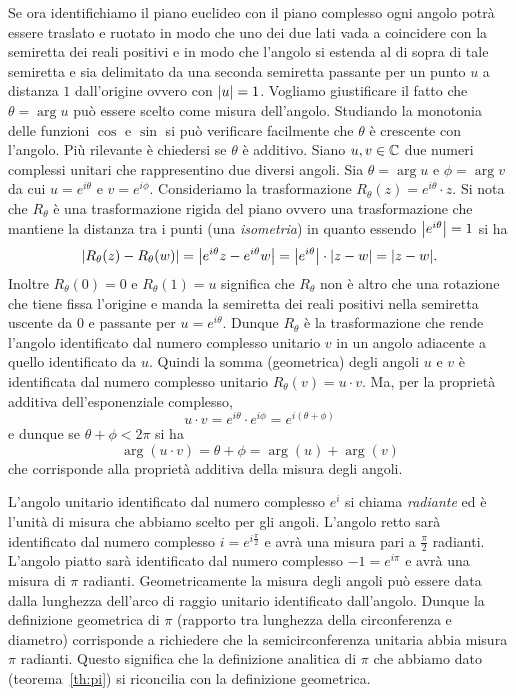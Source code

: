 Se ora identifichiamo il piano euclideo con il piano complesso ogni angolo
potrà essere traslato e ruotato in modo che uno dei due lati vada
a coincidere con la semiretta dei reali positivi e in modo che l'angolo si
estenda al di sopra di tale semiretta e sia delimitato da una seconda
semiretta passante per un punto $u$ a distanza $1$ dall'origine
ovvero con ${\left|u\right|}=1$. Vogliamo giustificare il fatto che $\theta = \arg u$
può essere scelto come misura dell'angolo.
Studiando la monotonia delle funzioni $\cos$ e $\sin$ si può verificare facilmente
che $\theta$ è crescente con l'angolo. Più rilevante è chiedersi se
$\theta$ è additivo.
Siano $u,v\in {\mathbb C}$ due numeri complessi unitari che rappresentino due diversi
angoli. Sia $\theta = \arg u$ e $\phi=\arg v$ da cui
$u=e^{i\theta}$ e $v=e^{i\phi}$.
Consideriamo la trasformazione $R_\theta(z) = e^{i\theta}\cdot z$.
Si nota che $R_\theta$ è una trasformazione rigida del piano ovvero
una trasformazione che mantiene la distanza tra i punti
(una \emph{isometria})
in quanto essendo ${\left|e^{i\theta}\right|}=1$ si ha
\[
{\left|R_\theta(z)-R_\theta(w)\right|} = {\left|e^{i\theta}z-e^{i\theta}w\right|}
= {\left|e^{i\theta}\right|}\cdot{\left|z-w\right|} = {\left|z-w\right|}.
\]
Inoltre $R_\theta(0)=0$ e $R_\theta(1)=u$ significa che $R_\theta$ non è altro che una
rotazione che tiene fissa l'origine e manda la semiretta dei reali
positivi nella semiretta uscente da $0$ e passante per $u=e^{i\theta}$.
Dunque $R_\theta$ è la trasformazione che rende l'angolo identificato
dal numero complesso unitario $v$ in un angolo adiacente a quello
identificato da $u$. Quindi la somma (geometrica) degli angoli
$u$ e $v$ è identificata dal numero complesso unitario
$R_\theta(v) = u\cdot v$.
Ma, per la proprietà additiva dell'esponenziale complesso,
\[
 u\cdot v = e^{i\theta} \cdot e^{i\phi} = e^{i(\theta+\phi)}
\]
e dunque se $\theta+\phi<2\pi$ si ha
\[
 \arg(u\cdot v) = \theta + \phi = \arg(u) + \arg(v)
\]
che corrisponde alla proprietà additiva della misura degli angoli.

L'angolo unitario identificato dal numero complesso $e^i$
si chiama \emph{radiante}%
%
 ed è l'unità di misura che abbiamo scelto
per gli angoli.
L'angolo retto sarà identificato dal numero complesso $i=e^{i\frac \pi 2}$
e avrà una misura pari a $\frac \pi 2$ radianti. L'angolo piatto sarà identificato
dal numero complesso $-1 = e^{i\pi}$ e avrà una misura di $\pi$ radianti.
Geometricamente la misura degli angoli può essere data dalla lunghezza
dell'arco di raggio unitario identificato dall'angolo. Dunque la definizione
geometrica di $\pi$ (rapporto tra lunghezza della circonferenza e diametro)
corrisponde a richiedere che la semicirconferenza unitaria abbia misura
$\pi$ radianti.
Questo significa che la definizione analitica di $\pi$ che abbiamo
dato (teorema~\ref{th:pi}) si riconcilia con la definizione geometrica.

